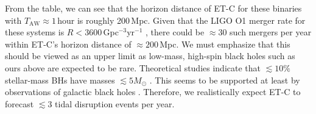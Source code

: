 \documentclass[prd,amsmath,amssymb,aps,floats,amsfonts,notitlepage,superscriptaddress,eqsecnum,nofootinbib,10pt]{revtex4-1}
\newcommand{\f}{\frac}
\newcommand{\be}{\begin{equation}}
\newcommand{\ee}{\end{equation}}
\begin{document}
From the table, we can see that the horizon distance of ET-C for these binaries with $T_\text{AW} \approx 1\,$hour is roughly 200\,Mpc.
Given that the LIGO O1 merger rate for these systems is $ R < 3600\,$Gpc$^{-3}$yr$^{-1}$ \cite{Abbott:2016ymx},
there could be $\approx 30$ such mergers per year within ET-C's horizon distance of $\approx 200\,$Mpc. %
We must emphasize that this should be viewed
as an upper limit as low-mass, high-spin black holes such as ours above are expected to be rare.
Theoretical studies indicate that $\lesssim 10\%$ stellar-mass BHs have masses $\lesssim 5 M_\odot$ \cite{Fryer:1999ht}.
This seems to be supported at least by observations of galactic black holes \cite{Ozel:2010su}.
Therefore, we realistically expect ET-C to forecast $\lesssim 3$ tidal disruption events per year.
%
\end{document}
